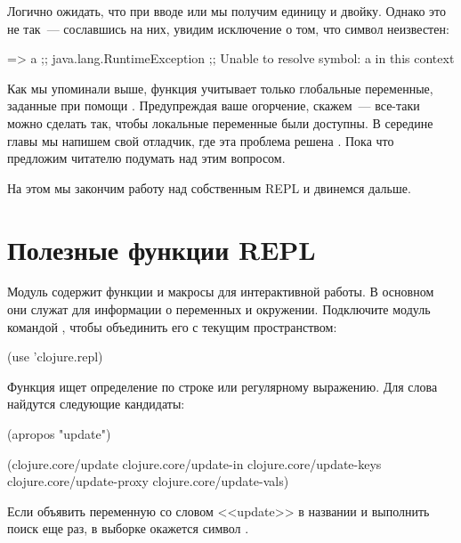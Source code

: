 Логично ожидать, что при вводе  или  мы получим единицу и двойку. Однако это не так~--- сославшись на них, увидим исключение о том, что символ неизвестен:

\begin{english}
  \begin{clojure}
=> a
;; java.lang.RuntimeException
;; Unable to resolve symbol: a in this context
  \end{clojure}
\end{english}

Как мы упоминали выше, функция  учитывает только глобальные переменные, заданные при помощи . Предупреждая ваше огорчение, скажем~--- все-таки можно сделать так, чтобы локальные переменные были доступны. В середине главы мы напишем свой отладчик, где эта проблема решена . Пока что предложим читателю подумать над этим вопросом.

На этом мы закончим работу над собственным REPL и двинемся дальше.

\section{Полезные функции REPL}

Модуль  содержит функции и макросы для интерактивной работы. В основном они служат для информации о переменных и окружении. Подключите модуль командой , чтобы объединить его с текущим пространством:

\begin{english}
  \begin{clojure}
(use 'clojure.repl)
  \end{clojure}
\end{english}

Функция  ищет определение по строке или регулярному выражению. Для слова  найдутся следующие кандидаты:

\begin{english}
  \begin{clojure}
(apropos "update")

(clojure.core/update
 clojure.core/update-in
 clojure.core/update-keys
 clojure.core/update-proxy
 clojure.core/update-vals)
  \end{clojure}
\end{english}

Если объявить переменную со словом <<update>> в названии и выполнить поиск еще раз, в выборке окажется символ .

